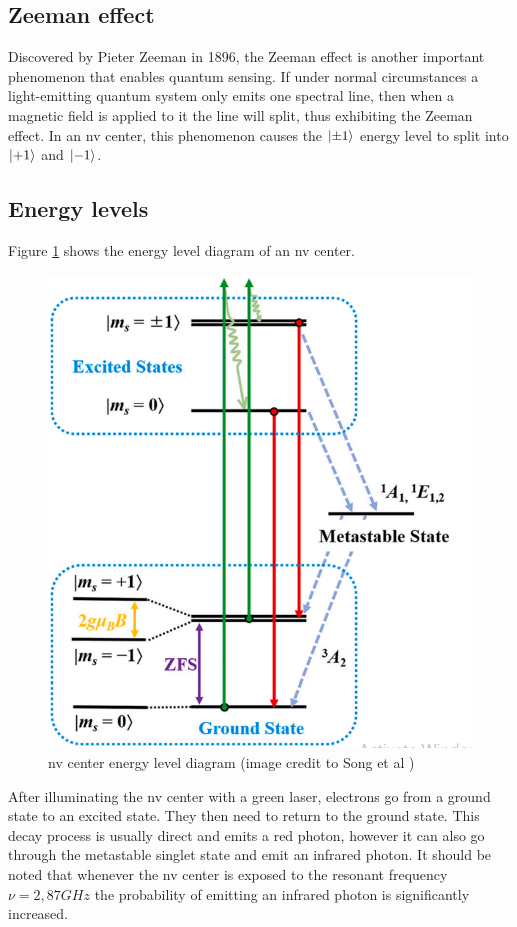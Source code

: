 \subsection{Zeeman effect}
Discovered by Pieter Zeeman in 1896, the Zeeman effect is another important phenomenon that enables quantum sensing. If under normal circumstances a light-emitting quantum system only emits one spectral line, then when a magnetic field is applied to it the line will split, thus exhibiting the Zeeman effect. In an \gls{nv} center, this phenomenon causes the $\ket{\pm1}$ energy level to split into $\ket{+1}$ and $\ket{-1}$. 

\subsection{Energy levels}\label{chap:energy_levels}
Figure \ref{fig:energylevels} shows the energy level diagram of an \gls{nv} center.

\begin{figure}[ht]
	\centering
	\includegraphics[width=0.7\linewidth]{img/energy_levels}
	\caption{\gls{nv} center energy level diagram (image credit to Song et al \cite{song2024enhancing})}
	\label{fig:energylevels}
\end{figure}

After illuminating the \gls{nv} center with a green laser, electrons go from a ground state to an excited state. They then need to return to the ground state. This decay process is usually direct and emits a red photon, however it can also go through the metastable singlet state and emit an infrared photon. It should be noted that whenever the \gls{nv} center is exposed to the resonant frequency $\nu = 2,87 GHz$ the probability of emitting an infrared photon is significantly increased.


